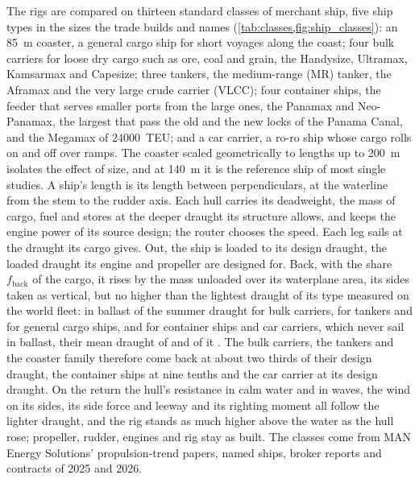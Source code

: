 The rigs are compared on thirteen standard classes of merchant ship, five ship types in the sizes the trade builds and names (\cref{tab:classes,fig:ship_classes}): an \SI{85}{m} coaster, a general cargo ship for short voyages along the coast; four bulk carriers for loose dry cargo such as ore, coal and grain, the Handysize, Ultramax, Kamsarmax and Capesize; three tankers, the medium-range (MR) tanker, the Aframax and the very large crude carrier (VLCC); four container ships, the feeder that serves smaller ports from the large ones, the Panamax and Neo-Panamax, the largest that pass the old and the new locks of the Panama Canal, and the Megamax of \num{24000}~TEU; and a car carrier, a ro-ro ship whose cargo rolls on and off over ramps. The coaster scaled geometrically to lengths up to \SI{200}{m} isolates the effect of size, and at \SI{140}{m} it is the reference ship of most single studies. A ship's length is its length between perpendiculars, at the waterline from the stem to the rudder axis. Each hull carries its deadweight, the mass of cargo, fuel and stores at the deeper draught its structure allows, and keeps the engine power of its source design; the router chooses the speed. Each leg sails at the draught its cargo gives. Out, the ship is loaded to its design draught, the loaded draught its engine and propeller are designed for. Back, with the share $f_\mathrm{back}$ of the cargo, it rises by the mass unloaded over its waterplane area, its sides taken as vertical, but no higher than the lightest draught of its type measured on the world fleet: in ballast  of the summer draught for bulk carriers,  for tankers and  for general cargo ships, and for container ships and car carriers, which never sail in ballast, their mean draught of  and  of it \citep{olmer2017}. The bulk carriers, the tankers and the coaster family therefore come back at about two thirds of their design draught, the container ships at nine tenths and the car carrier at its design draught. On the return the hull's resistance in calm water and in waves, the wind on its sides, its side force and leeway and its righting moment all follow the lighter draught, and the rig stands as much higher above the water as the hull rose; propeller, rudder, engines and rig stay as built. The classes come from MAN Energy Solutions' propulsion-trend papers, named ships, broker reports and contracts of 2025 and 2026.

